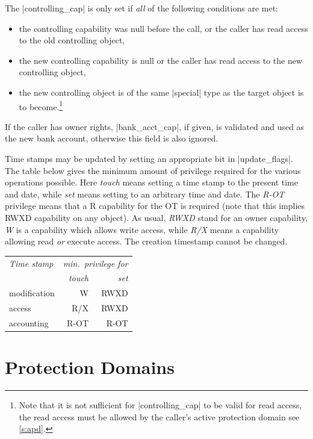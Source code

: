 \documentclass[a4paper,11pt,twoside,dvips]{report}
\begin{document}
\begin{description}
The |controlling\_cap| is only set if \emph{all} of the following
conditions are met:
\begin{itemize}
\item the controlling capability was null before the call, or the caller
has read access to the old controlling object,
\item the new controlling capability is null or the caller has read
access to the new controlling object,
\item the new controlling object is of the same |special| type as the
target object is to become.\footnote{Note that it is not sufficient for
|controlling\_cap| to be valid for read access, the read access must be
allowed by the caller's active protection domain see \autoref{s:apd}.}
\end{itemize}

If the caller has owner rights, |bank\_acct\_cap|, if given, is
validated and used as the new bank account, otherwise this field is also
ignored.

Time stamps may be updated by setting an appropriate bit in
|update\_flags|. The table below gives the minimum amount of privilege
required for the various operations possible. Here \emph{touch} means
setting a time stamp to the present time and date, while \emph{set}
means setting to an arbitrary time and date. The \emph{R-OT} privilege
means that a R capability for the OT is required (note that this implies
RWXD capability on any object). As usual, \emph{RWXD} stand for an owner
capability, \emph{W} is a capability which allows write access, while
\emph{R/X} means a capability allowing read \emph{or} execute
access. The creation timestamp cannot be changed.
\begin{center}
\begin{tabular}{l  r r}
\em Time stamp		& \multicolumn{2}{c}{\em min.\ privilege for}\\
			& \em touch		& \em set \\ \hline
modification		& W			& RWXD \\
access			& R/X			& RWXD \\
accounting		& R-OT			& R-OT \\
\end{tabular}
\end{center}
\end{description}





\chapter{\label{s:pd}Protection Domains}
\end{document}
